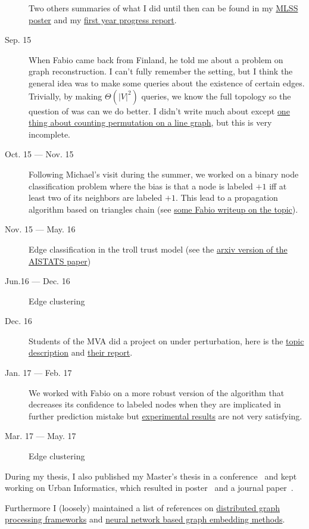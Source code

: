 \documentclass[a4paper,11pt,oneside,onecolumn,openany,final,svgnames]{memoir}
\begin{document}
\begin{description}
		Two others summaries of what I did until then can be found in my
		\href{run:support/postermlss.pdf}{MLSS poster} and my
		\href{run:support/progress.pdf}{first year progress report}.
	\item[Sep. 15]
		When Fabio came back from Finland, he told me about a problem on graph
		reconstruction. I can't fully remember the setting, but I think the general idea
		was to make some queries about the existence of certain edges. Trivially, by
		making $\Theta(|V|^2)$ queries, we know the full topology so the question of
		was can we do better. I didn't write much about except
		\href{run:support/permutation.pdf}{one thing about counting permutation on a
		line graph}, but this is very incomplete.
	\item[Oct. 15 --- Nov. 15] Following Michael's visit during the summer, we
		worked on a binary node classification problem where the bias is that a node
		is labeled $+1$ iff at least two of its neighbors are labeled $+1$. This
		lead to a propagation algorithm based on triangles chain (see
		\href{run:support/NodeClassification_triangle_mail_fabio_nov15.pdf}{some Fabio writeup on the topic}).
	\item[Nov. 15 --- May. 16] Edge classification in the troll trust model (see
		the \href{https://arxiv.org/pdf/1606.00182.pdf}{arxiv version of the AISTATS paper})
	\item[Jun.16 --- Dec. 16] Edge clustering
	\item[Dec. 16] Students of the MVA did a project on \pcc{} under perturbation,
		here is the \href{run:support/sujet1_ccpert.pdf}{topic description} and
		\href{run:support/Dubreuil_Ramzi_report.pdf}{their report}.
	\item[Jan. 17 --- Feb. 17] We worked with Fabio on a more robust version of
		the \shz{} algorithm that decreases its confidence to labeled nodes when
		they are implicated in further prediction mistake but
		\href{run:support/trees.pdf}{experimental results} are not very satisfying.
	\item[Mar. 17 --- May. 17] Edge clustering
\end{description}

During my thesis, I also published my Master's thesis in a
conference~\autocite{Thesis15} and kept working on Urban Informatics, which
resulted in poster~\autocite{WWWDemo16} and a journal
paper~\autocite{GeotopicTBD16}.

Furthermore I (loosely) maintained a list of references on
\href{run:support/dist.pdf}{distributed graph processing frameworks} and
\href{run:support/embedding.pdf}{neural network based graph embedding methods}.

\begingroup
\setlength\bibitemsep{2pt}
\printbibliography
\endgroup
\end{document}

